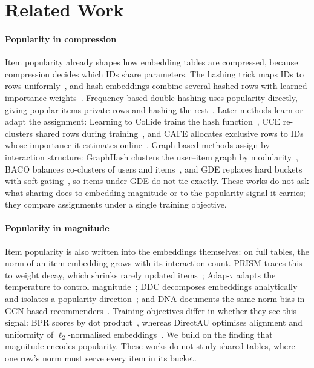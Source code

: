 \section{Related Work}\label{sec:related}

\paragraph{Popularity in compression}
Item popularity already shapes how embedding tables are compressed, because compression decides which IDs share parameters. The hashing trick maps IDs to rows uniformly~\cite{weinberger2009hashing}, and hash embeddings combine several hashed rows with learned importance weights~\cite{svenstrup2017hashemb}. Frequency-based double hashing uses popularity directly, giving popular items private rows and hashing the rest~\cite{zhang2020doublehash}. Later methods learn or adapt the assignment: Learning to Collide trains the hash function~\cite{ghaemmaghami2022collide}, CCE re-clusters shared rows during training~\cite{tsang2023cce}, and CAFE allocates exclusive rows to IDs whose importance it estimates online~\cite{zhang2024cafe}. Graph-based methods assign by interaction structure: GraphHash clusters the user--item graph by modularity~\cite{wu2025graphhash,blondel2008louvain}, BACO balances co-clusters of users and items~\cite{jiang2026baco}, and GDE replaces hard buckets with soft gating~\cite{lee2026gde}, so items under GDE do not tie exactly. These works do not ask what sharing does to embedding magnitude or to the popularity signal it carries; they compare assignments under a single training objective.

\paragraph{Popularity in magnitude}
Item popularity is also written into the embeddings themselves: on full tables, the norm of an item embedding grows with its interaction count. PRISM traces this to weight decay, which shrinks rarely updated items~\cite{loveland2025prism}; Adap-$\tau$ adapts the temperature to control magnitude~\cite{chen2023adaptau}; DDC decomposes embeddings analytically and isolates a popularity direction~\cite{liu2026ddc}; and DNA documents the same norm bias in GCN-based recommenders~\cite{choi2026dna}. Training objectives differ in whether they see this signal: BPR scores by dot product~\cite{rendle2009bpr}, whereas DirectAU optimises alignment and uniformity of $\ell_2$-normalised embeddings~\cite{wang2022directau}. We build on the finding that magnitude encodes popularity. These works do not study shared tables, where one row's norm must serve every item in its bucket.

